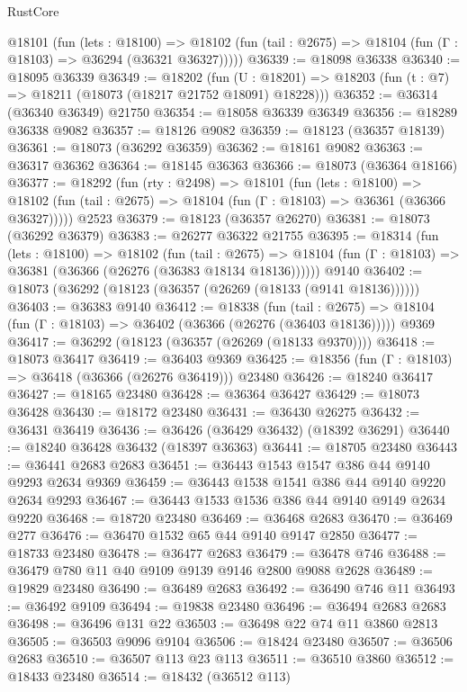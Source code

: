 \begin{lexlean}{RustCore}
\begin{coremodule}
    @18101
      (fun (lets : @18100) =>
      @18102 (fun (tail : @2675) => @18104 (fun (Γ : @18103) => @36294 (@36321 @36327)))))
@36339 := @18098 @36338
@36340 := @18095 @36339
@36349 := @18202
    (fun (U : @18201) => @18203 (fun (t : @7) => @18211 (@18073 (@18217 @21752 @18091) @18228)))
@36352 := @36314 (@36340 @36349) @21750
@36354 := @18058 @36339 @36349
@36356 := @18289 @36338 @9082
@36357 := @18126 @9082
@36359 := @18123 (@36357 @18139)
@36361 := @18073 (@36292 @36359)
@36362 := @18161 @9082
@36363 := @36317 @36362
@36364 := @18145 @36363
@36366 := @18073 (@36364 @18166)
@36377 := @18292
    (fun (rty : @2498) =>
    @18101
      (fun (lets : @18100) =>
      @18102 (fun (tail : @2675) => @18104 (fun (Γ : @18103) => @36361 (@36366 @36327)))))
    @2523
@36379 := @18123 (@36357 @26270)
@36381 := @18073 (@36292 @36379)
@36383 := @26277 @36322 @21755
@36395 := @18314
    (fun (lets : @18100) =>
    @18102
      (fun (tail : @2675) =>
      @18104 (fun (Γ : @18103) => @36381 (@36366 (@26276 (@36383 @18134 @18136))))))
    @9140
@36402 := @18073 (@36292 (@18123 (@36357 (@26269 (@18133 (@9141 @18136))))))
@36403 := @36383 @9140
@36412 := @18338
    (fun (tail : @2675) => @18104 (fun (Γ : @18103) => @36402 (@36366 (@26276 (@36403 @18136)))))
    @9369
@36417 := @36292 (@18123 (@36357 (@26269 (@18133 @9370))))
@36418 := @18073 @36417
@36419 := @36403 @9369
@36425 := @18356 (fun (Γ : @18103) => @36418 (@36366 (@26276 @36419))) @23480
@36426 := @18240 @36417
@36427 := @18165 @23480
@36428 := @36364 @36427
@36429 := @18073 @36428
@36430 := @18172 @23480
@36431 := @36430 @26275
@36432 := @36431 @36419
@36436 := @36426 (@36429 @36432) (@18392 @36291)
@36440 := @18240 @36428 @36432 (@18397 @36363)
@36441 := @18705 @23480
@36443 := @36441 @2683 @2683
@36451 := @36443 @1543 @1547 @386 @44 @9140 @9293 @2634 @9369
@36459 := @36443 @1538 @1541 @386 @44 @9140 @9220 @2634 @9293
@36467 := @36443 @1533 @1536 @386 @44 @9140 @9149 @2634 @9220
@36468 := @18720 @23480
@36469 := @36468 @2683
@36470 := @36469 @277
@36476 := @36470 @1532 @65 @44 @9140 @9147 @2850
@36477 := @18733 @23480
@36478 := @36477 @2683
@36479 := @36478 @746
@36488 := @36479 @780 @11 @40 @9109 @9139 @9146 @2800 @9088 @2628
@36489 := @19829 @23480
@36490 := @36489 @2683
@36492 := @36490 @746 @11
@36493 := @36492 @9109
@36494 := @19838 @23480
@36496 := @36494 @2683 @2683
@36498 := @36496 @131 @22
@36503 := @36498 @22 @74 @11 @3860 @2813
@36505 := @36503 @9096 @9104
@36506 := @18424 @23480
@36507 := @36506 @2683
@36510 := @36507 @113 @23 @113
@36511 := @36510 @3860
@36512 := @18433 @23480
@36514 := @18432 (@36512 @113)

\end{coremodule}
\end{lexlean}
